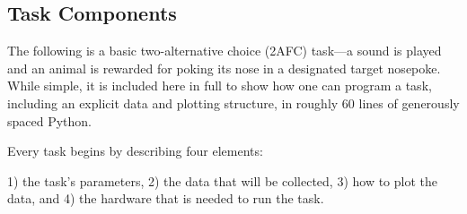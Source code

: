 \subsection{Task Components}
\label{sec:taskcomponents}

The following is a basic two-alternative choice (2AFC) task---a sound is played and an animal is rewarded for poking its nose in a designated target nosepoke. While simple, it is included here in full to show how one can program a task, including an explicit data and plotting structure, in roughly 60 lines of generously spaced Python.

\vspace{12pt}

Every task begins by describing four elements: 

1) the task's parameters, 2) the data that will be collected, 3) how to plot the data, and 4) the hardware that is needed to run the task.

